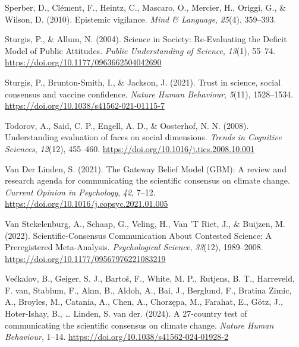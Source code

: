 \documentclass[
  man,
  floatsintext,
  longtable,
  nolmodern,
  notxfonts,
  notimes,
  colorlinks=true,linkcolor=blue,citecolor=blue,urlcolor=blue]{apa7}
\newlength{\cslhangindent}
\newenvironment{CSLReferences}[2] %
 {\begin{list}{}{%
  \setlength{\itemindent}{0pt}
  \setlength{\leftmargin}{0pt}
  \setlength{\parsep}{0pt}
  \ifodd #1
   \setlength{\leftmargin}{\cslhangindent}
   \setlength{\itemindent}{-1\cslhangindent}
  \fi
  \setlength{\itemsep}{#2\baselineskip}}}
 {\end{list}}
\begin{document}
\begin{CSLReferences}{1}{0}
Sperber, D., Clément, F., Heintz, C., Mascaro, O., Mercier, H., Origgi,
G., \& Wilson, D. (2010). Epistemic vigilance. \emph{Mind \& Language},
\emph{25}(4), 359--393.

Sturgis, P., \& Allum, N. (2004). Science in Society: Re-Evaluating the
Deficit Model of Public Attitudes. \emph{Public Understanding of
Science}, \emph{13}(1), 55--74.
\url{https://doi.org/10.1177/0963662504042690}

Sturgis, P., Brunton-Smith, I., \& Jackson, J. (2021). Trust in science,
social consensus and vaccine confidence. \emph{Nature Human Behaviour},
\emph{5}(11), 1528--1534.
\url{https://doi.org/10.1038/s41562-021-01115-7}

Todorov, A., Said, C. P., Engell, A. D., \& Oosterhof, N. N. (2008).
Understanding evaluation of faces on social dimensions. \emph{Trends in
Cognitive Sciences}, \emph{12}(12), 455--460.
\url{https://doi.org/10.1016/j.tics.2008.10.001}

Van Der Linden, S. (2021). The Gateway Belief Model (GBM): A review and
research agenda for communicating the scientific consensus on climate
change. \emph{Current Opinion in Psychology}, \emph{42}, 7--12.
\url{https://doi.org/10.1016/j.copsyc.2021.01.005}

Van Stekelenburg, A., Schaap, G., Veling, H., Van 'T Riet, J., \&
Buijzen, M. (2022). Scientific-Consensus Communication About Contested
Science: A Preregistered Meta-Analysis. \emph{Psychological Science},
\emph{33}(12), 1989--2008.
\url{https://doi.org/10.1177/09567976221083219}

Većkalov, B., Geiger, S. J., Bartoš, F., White, M. P., Rutjens, B. T.,
Harreveld, F. van, Stablum, F., Akın, B., Aldoh, A., Bai, J., Berglund,
F., Bratina Zimic, A., Broyles, M., Catania, A., Chen, A., Chorzępa, M.,
Farahat, E., Götz, J., Hoter-Ishay, B., \ldots{} Linden, S. van der.
(2024). A 27-country test of communicating the scientific consensus on
climate change. \emph{Nature Human Behaviour}, 1--14.
\url{https://doi.org/10.1038/s41562-024-01928-2}


\end{CSLReferences}
\end{document}
